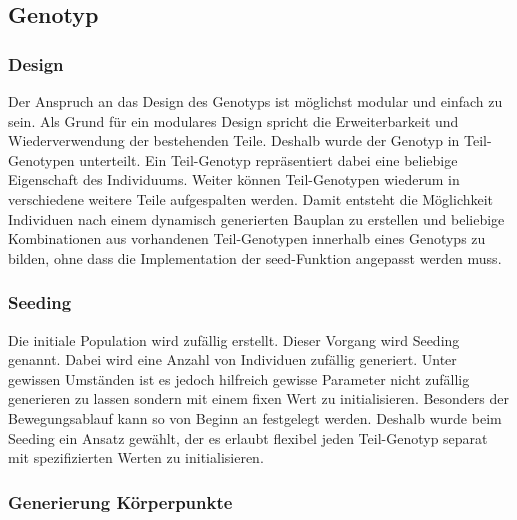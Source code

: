     \subsection{Genotyp\label{sub:Genotype}}

      \subsubsection{Design\label{subsub:GenotypeDesign}}

        Der Anspruch an das Design des Genotyps ist möglichst modular und einfach zu sein.
        Als Grund für ein modulares Design spricht die Erweiterbarkeit und Wiederverwendung der bestehenden Teile.
        Deshalb wurde der Genotyp in Teil-Genotypen unterteilt.
        Ein Teil-Genotyp repräsentiert dabei eine beliebige Eigenschaft des Individuums.
        Weiter können Teil-Genotypen wiederum in verschiedene weitere Teile aufgespalten werden.
        Damit entsteht die Möglichkeit Individuen nach einem dynamisch generierten Bauplan zu erstellen
        und beliebige Kombinationen aus vorhandenen Teil-Genotypen innerhalb eines Genotyps zu bilden,
        ohne dass die Implementation der seed-Funktion angepasst werden muss.

        \subsubsection{Seeding\label{subsub:GenotypeSeeding}}

          Die initiale Population wird zufällig erstellt. Dieser Vorgang wird Seeding genannt.
          Dabei wird eine Anzahl von Individuen zufällig generiert.
          Unter gewissen Umständen ist es jedoch hilfreich gewisse Parameter nicht zufällig generieren zu lassen
          sondern mit einem fixen Wert zu initialisieren.
          Besonders der Bewegungsablauf kann so von Beginn an festgelegt werden.
          Deshalb wurde beim Seeding ein Ansatz gewählt, der es erlaubt flexibel jeden Teil-Genotyp separat mit
          spezifizierten Werten zu initialisieren.

      \subsubsection{Generierung Körperpunkte\label{subsub:GenotypGenerierungKörperpunkte}}

